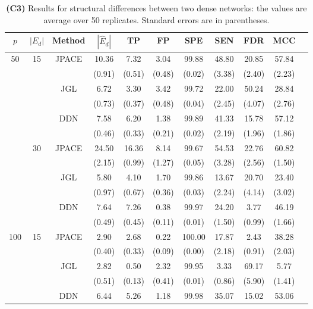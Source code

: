 \documentclass[useAMS,usenatbib,referee]{bio}
\begin{document}
{\begin{table}[htb!]
\caption{{\bf (C3)} Results for structural differences between two dense
networks: the values are average over 50 replicates.
Standard errors are in parentheses.}
\medskip
\centering
{ %
\begin{tabular}{||c|c|c||c|c|c|c|c|c|c||c} \cline{1-10}
$p$  &  $|E_d|$  & Method & $|\hat{E}_d|$ & TP & FP & SPE & SEN & FDR & MCC \\ \hline 
\multirow{12}{*}{50}  &\multirow{6}{*}{15}  & \multirow{2}{*}{JPACE} &10.36 & 7.32 & 3.04 & 99.88 & 48.80 & 20.85 & 57.84 \\ 
& & & (0.91) & (0.51) & (0.48) & (0.02) & (3.38) & (2.40) & (2.23) \\ \cline{3-10} 
& & \multirow{2}{*}{JGL} & 6.72 & 3.30 & 3.42 & 99.72 & 22.00 & 50.24 & 28.84 \\ 
 & & & (0.73) & (0.37) & (0.48) & (0.04) & (2.45) & (4.07) & (2.76) \\ \cline{3-10} 
& & \multirow{2}{*}{DDN} & 7.58 & 6.20 & 1.38 & 99.89 & 41.33 & 15.78 & 57.12 \\ 
 & & & (0.46) & (0.33) & (0.21) & (0.02) & (2.19) & (1.96) & (1.86) \\\cline{2-10} 
  &\multirow{6}{*}{30}  & \multirow{2}{*}{JPACE} &24.50 & 16.36 & 8.14 & 99.67 & 54.53 & 22.76 & 60.82 \\ 
& & & (2.15) & (0.99) & (1.27) & (0.05) & (3.28) & (2.56) & (1.50) \\ \cline{3-10} 
& & \multirow{2}{*}{JGL} & 5.80 & 4.10 & 1.70 & 99.86 & 13.67 & 20.70 & 23.40 \\ 
 & & & (0.97) & (0.67) & (0.36) & (0.03) & (2.24) & (4.14) & (3.02) \\ \cline{3-10} 
& & \multirow{2}{*}{DDN} & 7.64 & 7.26 & 0.38 & 99.97 & 24.20 & 3.77 & 46.19 \\ 
 & & & (0.49) & (0.45) & (0.11) & (0.01) & (1.50) & (0.99) & (1.66) \\\cline{1-10} 
\multirow{12}{*}{100}  &\multirow{6}{*}{15}  & \multirow{2}{*}{JPACE} &2.90 & 2.68 & 0.22 & 100.00 & 17.87 & 2.43 & 38.28 \\ 
& & & (0.40) & (0.33) & (0.09) & (0.00) & (2.18) & (0.91) & (2.03) \\ \cline{3-10} 
& & \multirow{2}{*}{JGL} & 2.82 & 0.50 & 2.32 & 99.95 & 3.33 & 69.17 & 5.77 \\ 
 & & & (0.51) & (0.13) & (0.41) & (0.01) & (0.86) & (5.90) & (1.41) \\ \cline{3-10} 
& & \multirow{2}{*}{DDN} & 6.44 & 5.26 & 1.18 & 99.98 & 35.07 & 15.02 & 53.06 \\ 

\end{tabular}}
\end{table}}
\end{document}
